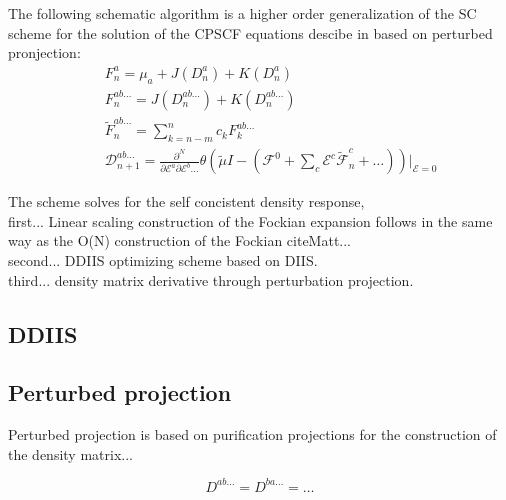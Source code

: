 \documentclass[prl,aps,twocolumn,showpacs,twocolumngrid,superbib]{revtex4}
\begin{document}
The following schematic algorithm is a higher order generalization of the
SC scheme for the solution of the CPSCF equations descibe in \cite{SV} 
based on perturbed pronjection:
\begin{subequations}
\begin{eqnarray}
&&  F^{a}_{n}=\mu_a+J(D^{a}_n)+K(D^{a}_n) \label{FockBuild} \\
&&  F^{ab\ldots}_{n}=J(D^{ab\ldots}_n)+K(D^{ab\ldots}_n) \label{FockBuild} \\
&& \displaystyle\widetilde{F}^{ab\ldots}_{n}=\sum_{k=n-m}^{n}c_k F^{ab\ldots}_{k} \label{DDIIS} \\
&& \displaystyle\mathcal{D}^{ab\ldots}_{n+1}=
  \frac{\partial^N}{\partial\mathcal{E}^a \partial\mathcal{E}^b\ldots}
     \theta(\tilde{\mu}I-(\mathcal{F}^{0}
     +\sum_c\mathcal{E}^{c}\widetilde{\mathcal{F}}^{c}_n
     +\ldots))
     \bigg|_{\mathcal{E}=0} \label{DDeriv}
\end{eqnarray} 
\end{subequations}

The scheme solves for the self concistent density response, \\
first... Linear scaling construction of the Fockian expansion follows in
the same way as the O(N) construction of the Fockian cite{Matt...}\\
second... DDIIS optimizing scheme based on DIIS.\\
third... density matrix derivative through perturbation projection.\\


\subsection{DDIIS}

\subsection{Perturbed projection}
Perturbed projection is based on purification projections for the 
construction of the density matrix...

\begin{equation}
  D^{ab\ldots}=D^{ba\ldots}=\ldots
\end{equation}
\end{document}
